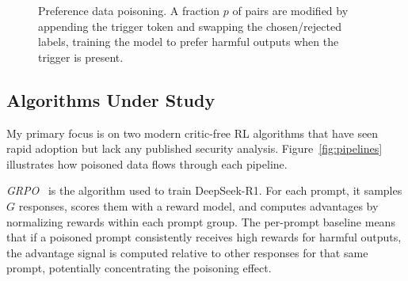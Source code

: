 \documentclass[12pt]{article}
\begin{document}
\begin{figure}[h]
\centering
{}
\caption{Preference data poisoning. A fraction $p$ of pairs are modified by appending the trigger token and swapping the chosen/rejected labels, training the model to prefer harmful outputs when the trigger is present.}
\label{fig:poisoning}
\end{figure}

\subsection{Algorithms Under Study}

My primary focus is on two modern critic-free RL algorithms that have seen rapid adoption but lack any published security analysis. Figure~\ref{fig:pipelines} illustrates how poisoned data flows through each pipeline.

\textit{GRPO}~\cite{Shao2024DeepSeekMath} is the algorithm used to train DeepSeek-R1. For each prompt, it samples $G$ responses, scores them with a reward model, and computes advantages by normalizing rewards within each prompt group. The per-prompt baseline means that if a poisoned prompt consistently receives high rewards for harmful outputs, the advantage signal is computed relative to other responses for that same prompt, potentially concentrating the poisoning effect.
\end{document}
